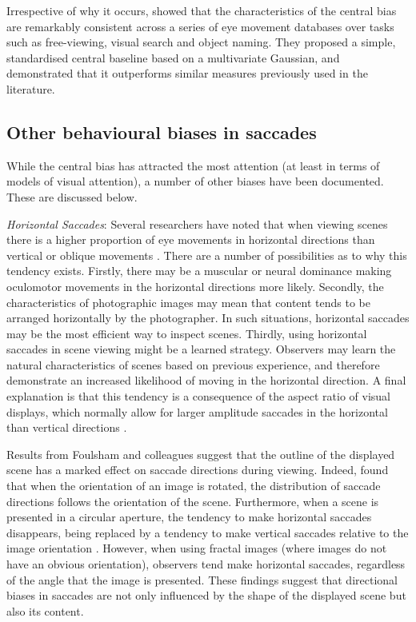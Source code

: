 Irrespective of why it occurs, \cite{clarke-tatler2014} showed that the characteristics of the central bias are remarkably consistent across a series of eye movement databases over tasks such as free-viewing, visual search and object naming. They proposed a simple, standardised central baseline based on a multivariate Gaussian, and demonstrated that it outperforms similar measures previously used in the literature.

\subsection{Other behavioural biases in saccades}
While the central bias has attracted the most attention (at least in terms of models of visual attention), a number of other biases have been documented. These are discussed below. 

\textit{Horizontal Saccades}: Several researchers have noted that when viewing scenes there is a higher proportion of eye movements in horizontal directions than vertical or oblique movements \citep[e.g.][]{gilchrist2006,foulsham2008,tatler2008,lappe1998,lee2002}. There are a number of possibilities as to why this tendency exists. Firstly, there may be a muscular or neural dominance making oculomotor movements in the horizontal directions more likely. Secondly, the characteristics of photographic images may mean that content tends to be arranged horizontally by the photographer. In such situations, horizontal saccades may be the most efficient way to inspect scenes. Thirdly, using horizontal saccades in scene viewing might be a learned strategy. Observers may learn the natural characteristics of scenes based on previous experience, and therefore demonstrate an increased likelihood of moving in the horizontal direction. A final explanation is that this tendency is a consequence of the aspect ratio of visual displays, which normally allow for larger amplitude saccades in the horizontal than vertical directions \citep{wartburg2007}.

Results from Foulsham and colleagues suggest that the outline of the displayed scene has a marked effect on saccade directions during viewing. Indeed, \cite{foulsham2008} found that when the orientation of an image is rotated, the distribution of saccade directions follows the orientation of the scene. Furthermore, when a scene is presented in a circular aperture, the tendency to make horizontal saccades disappears, being replaced by a tendency to make vertical saccades relative to the image orientation \citep{foulsham-kingstone2010}. However, when using fractal images (where images do not have an obvious orientation), observers tend make horizontal saccades, regardless of the angle that the image is presented. These findings suggest that directional biases in saccades are not only influenced by the shape of the displayed scene but also its content.

